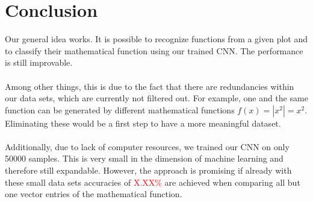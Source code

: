 \documentclass[11pt,a4paper]{scrartcl}
\begin{document}
\section{Conclusion}
Our general idea works. It is possible to recognize functions from a given plot and to classify their mathematical function using our trained CNN. The performance is still improvable. \\
\\
Among other things, this is due to the fact that there are redundancies within our data sets, which are currently not filtered out. For example, one and the same function can be generated by different mathematical functions \(f(x) = |x^2| = x^2\). Eliminating these would be a first step to have a more meaningful dataset. \\
\\
Additionally, due to lack of computer resources, we trained our CNN on only 50000 samples. This is very small in the dimension of machine learning and therefore still expandable. However, the approach is promising if already with these small data sets accuracies of \textcolor{red}{X.XX\%} are achieved when comparing all but one vector entries of the mathematical function. 
\end{document}
